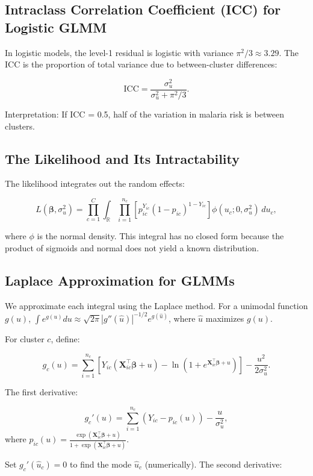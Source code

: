 \documentclass[12pt]{article}
\begin{document}
	\subsection{Intraclass Correlation Coefficient (ICC) for Logistic GLMM}
	
	In logistic models, the level-1 residual is logistic with variance $\pi^2/3 \approx 3.29$. The ICC is the proportion of total variance due to between-cluster differences:
	
	\[
	\text{ICC} = \frac{\sigma_u^2}{\sigma_u^2 + \pi^2/3}.
	\]
	
	Interpretation: If ICC = 0.5, half of the variation in malaria risk is between clusters.
	
	\subsection{The Likelihood and Its Intractability}
	
	The likelihood integrates out the random effects:
	
	\[
	L(\boldsymbol{\beta}, \sigma_u^2) = \prod_{c=1}^C \int_{\mathbb{R}} \prod_{i=1}^{n_c} \left[ p_{ic}^{Y_{ic}} (1-p_{ic})^{1-Y_{ic}} \right] \phi(u_c; 0, \sigma_u^2) \, du_c,
	\]
	
	where $\phi$ is the normal density. This integral has no closed form because the product of sigmoids and normal does not yield a known distribution.
	
	\subsection{Laplace Approximation for GLMMs}
	
	We approximate each integral using the Laplace method. For a unimodal function $g(u)$, $\int e^{g(u)} du \approx \sqrt{2\pi} |g''(\hat{u})|^{-1/2} e^{g(\hat{u})}$, where $\hat{u}$ maximizes $g(u)$.
	
	For cluster $c$, define:
	
	\[
	g_c(u) = \sum_{i=1}^{n_c} \left[ Y_{ic} (\mathbf{X}_{ic}^\top \boldsymbol{\beta} + u) - \ln(1+e^{\mathbf{X}_{ic}^\top \boldsymbol{\beta} + u}) \right] - \frac{u^2}{2\sigma_u^2}.
	\]
	
	The first derivative:
	
	\[
	g_c'(u) = \sum_{i=1}^{n_c} (Y_{ic} - p_{ic}(u)) - \frac{u}{\sigma_u^2},
	\]
	where $p_{ic}(u) = \frac{\exp(\mathbf{X}_{ic}^\top \boldsymbol{\beta} + u)}{1+\exp(\mathbf{X}_{ic}^\top \boldsymbol{\beta} + u)}$.
	
	Set $g_c'(\hat{u}_c)=0$ to find the mode $\hat{u}_c$ (numerically). The second derivative:
	
\end{document}
